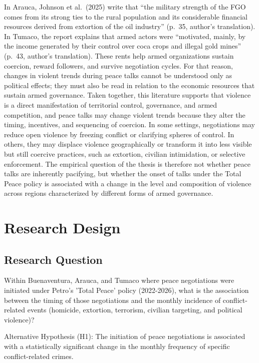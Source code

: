 \documentclass[11pt]{article}
\begin{document}
In Arauca, Johnson et al. (2025) write that ``the military strength of the FGO comes from its strong ties to the rural population and its considerable financial resources derived from extortion of the oil industry'' (p.~35, author's translation). In Tumaco, the report explains that armed actors were ``motivated, mainly, by the income generated by their control over coca crops and illegal gold mines'' (p.~43, author's translation). These rents help armed organizations sustain coercion, reward followers, and survive negotiation cycles. For that reason, changes in violent trends during peace talks cannot be understood only as political effects; they must also be read in relation to the economic resources that sustain armed governance. Taken together, this literature supports that violence is a direct manifestation of territorial control, governance, and armed competition, and peace talks may change violent trends because they alter the timing, incentives, and sequencing of coercion. In some settings, negotiations may reduce open violence by freezing conflict or clarifying spheres of control. In others, they may displace violence geographically or transform it into less visible but still coercive practices, such as extortion, civilian intimidation, or selective enforcement. The empirical question of the thesis is therefore not whether peace talks are inherently pacifying, but whether the onset of talks under the Total Peace policy is associated with a change in the level and composition of violence across regions characterized by different forms of armed governance.

\section{Research Design}
\subsection{Research Question}\label{research-question}

Within Buenaventura, Arauca, and Tumaco where peace negotiations were initiated under Petro's 'Total Peace' policy (2022-2026), what is the association between the timing of those negotiations and the monthly incidence of conflict-related events (homicide, extortion, terrorism, civilian targeting, and political violence)?

Alternative Hypothesis (H1):
The initiation of peace negotiations is associated with a statistically significant change in the monthly frequency of specific conflict-related crimes. 
\end{document}
